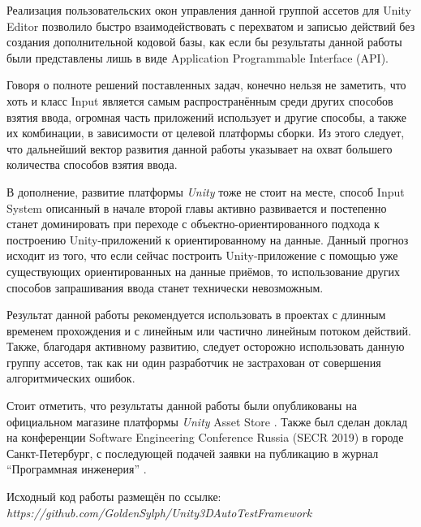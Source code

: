 Реализация пользовательских окон управления данной группой ассетов для Unity Editor позволило быстро взаимодействовать с перехватом и записью действий без создания дополнительной кодовой базы, как если бы результаты данной работы были представлены лишь в виде Application Programmable Interface (API).

Говоря о полноте решений поставленных задач, конечно нельзя не заметить, что хоть и класс Input является самым распространённым среди других способов взятия ввода, огромная часть приложений использует и другие способы, а также их комбинации, в зависимости от целевой платформы сборки. Из этого следует, что дальнейший вектор развития данной работы указывает на охват большего количества способов взятия ввода. 

В дополнение, развитие платформы \textit{Unity} тоже не стоит на месте, способ Input System описанный в начале второй главы активно развивается и постепенно станет доминировать при переходе с объектно-ориентированного подхода к построению Unity-приложений к ориентированному на данные. Данный прогноз исходит из того, что если сейчас построить Unity-приложение с помощью уже существующих ориентированных на данные приёмов, то использование других способов запрашивания ввода станет технически невозможным.

Результат данной работы рекомендуется использовать в проектах с длинным временем прохождения и с линейным или частично линейным потоком действий. Также, благодаря активному развитию, следует осторожно использовать данную группу ассетов, так как ни один разработчик не застрахован от совершения алгоритмических ошибок.

Стоит отметить, что результаты данной работы были опубликованы на официальном магазине платформы \textit{Unity} Asset Store \cite{assetstore}. Также был сделан доклад на конференции Software Engineering Conference Russia (SECR 2019) \cite{secr} в городе Санкт-Петербург, с последующей подачей заявки на публикацию в журнал ``Программная инженерия'' \cite{prog_engine_journal}.

Исходный код работы размещён по ссылке: \textit{https://github.com/GoldenSylph/Unity3DAutoTestFramework}